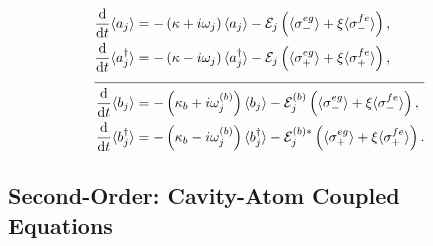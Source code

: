 \documentclass{article}
\newcommand{\ddt}[1][]{\frac{\mathrm{d} #1}{\mathrm{d}t}}
\begin{document}
\begin{subequations}
	\begin{align}
		\ddt \langle a_{j} \rangle &= -\left( \kappa + i \omega_{j} \right) \langle a_{j} \rangle - \mathcal{E}_{j} \left( \langle \sigma^{eg}_{-} \rangle + \xi \langle \sigma^{fe}_{-} \rangle \right), \\
		\ddt \langle a_{j}^{\dagger} \rangle &= -\left( \kappa - i \omega_{j} \right) \langle a_{j}^{\dagger} \rangle - \mathcal{E}_{j} \left( \langle \sigma^{eg}_{+} \rangle + \xi \langle \sigma^{fe}_{+} \rangle \right), \\
		\cline{1-2}
		\ddt \langle b_{j} \rangle &= -\left( \kappa_{b} + i \omega_{j}^{(b)} \right) \langle b_{j} \rangle - \mathcal{E}_{j}^{(b)} \left( \langle \sigma^{eg}_{-} \rangle + \xi \langle \sigma^{fe}_{-} \rangle \right), \\
		\ddt \langle b^{\dagger}_{j} \rangle &= -\left( \kappa_{b} - i \omega_{j}^{(b)} \right) \langle b^{\dagger}_{j} \rangle - \mathcal{E}_{j}^{(b) *} \left( \langle \sigma^{eg}_{+} \rangle + \xi \langle \sigma^{fe}_{+} \rangle \right).
	\end{align}
\end{subequations}

\subsection{Second-Order: Cavity-Atom Coupled Equations}
\end{document}
